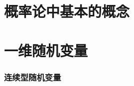 
\usepackage{ctex}
\usepackage{pifont}



% 

\part{概率论中基本的概念}





\part{一维随机变量}



\section{连续型随机变量}



    

